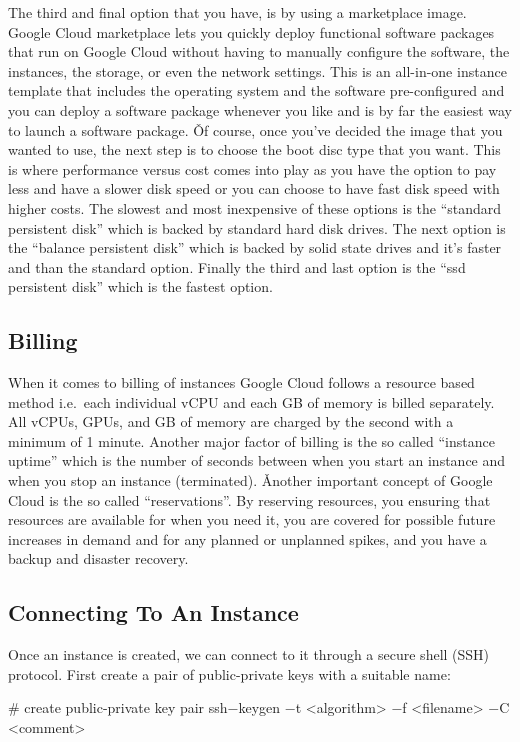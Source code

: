 The third and final option that you have, is by using a marketplace image. Google Cloud marketplace lets you quickly
deploy functional software packages that run on Google Cloud without having to manually configure the software, the
instances, the storage, or even the network settings. This is an all-in-one instance template that includes the
operating system and the software pre-configured and you can deploy a software package whenever you like and is by
far the easiest way to launch a software package. \v

Of course, once you've decided the image that you wanted to use, the next step is to choose the boot disc type that
you want. This is where performance versus cost comes into play as you have the option to pay less and have a slower
disk speed or you can choose to have fast disk speed with higher costs. The slowest and most inexpensive of these
options is the ``standard persistent disk'' which is backed by standard hard disk drives. The next option is the
``balance persistent disk'' which is backed by solid state drives and it's faster and than the standard option.
Finally the third and last option is the ``ssd persistent disk'' which is the fastest option.

\subsection{Billing}

When it comes to billing of instances Google Cloud follows a resource based method i.e.\ each individual vCPU and
each GB of memory is billed separately. All vCPUs, GPUs, and GB of memory are charged by the second with a minimum of
1 minute. Another major factor of billing is the so called ``instance uptime'' which is the number of seconds between
when you start an instance and when you stop an instance (terminated). \v

Another important concept of Google Cloud is the so called ``reservations''. By reserving resources, you ensuring
that resources are available for when you need it, you are covered for possible future increases in demand and for any
planned or unplanned spikes, and you have a backup and disaster recovery.

\subsection{Connecting To An Instance}

Once an instance is created, we can connect to it through a secure shell (SSH) protocol. First create a pair of
public-private keys with a suitable name:
\begin{bash}
# create public-private key pair
ssh$-$keygen $-$t <algorithm> $-$f <filename> $-$C <comment>
\end{bash}

